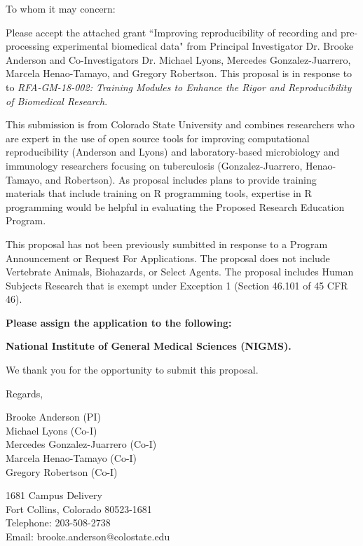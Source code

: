 \documentclass[pdftex,english,11pt,parskip=half]{scrartcl}
\begin{document}
\def\bf{\normalfont\bfseries}
\pagestyle{empty}

To whom it may concern:

\vspace{0.2in}

Please accept the attached grant ``Improving reproducibility of recording and pre-processing experimental biomedical data" from Principal Investigator Dr. Brooke Anderson and Co-Investigators Dr. Michael Lyons, Mercedes Gonzalez-Juarrero, Marcela Henao-Tamayo, and Gregory Robertson. This proposal is in response to to \textit{RFA-GM-18-002: Training Modules to Enhance the Rigor and Reproducibility of Biomedical Research}.

\vspace{0.1in}

This submission is from Colorado State University and combines researchers who are expert in the use of open source tools for improving computational reproducibility (Anderson and Lyons) and laboratory-based microbiology and immunology researchers focusing on tuberculosis (Gonzalez-Juarrero, Henao-Tamayo, and Robertson). As proposal includes plans to provide training materials that include training on R programming tools, expertise in R programming would be helpful in evaluating the Proposed Research Education Program.

\vspace{0.1in}

This proposal has not been previously sumbitted in response to a Program Announcement or Request For Applications. The proposal does not include Vertebrate Animals, Biohazards, or Select Agents. The proposal includes Human Subjects Research that is exempt under Exception 1 (Section 46.101 of 45 CFR 46).

\vspace{0.1in}

\noindent \textbf{Please assign the application to the following:}
\begin{description}
 \item \textbf{National Institute of General Medical Sciences (NIGMS).} 
 \end{description}

\vspace{0.1in}

We thank you for the opportunity to submit this proposal. 

\vspace{0.2in}

Regards, 

Brooke Anderson (PI) \\
Michael Lyons (Co-I) \\
Mercedes Gonzalez-Juarrero (Co-I) \\
Marcela Henao-Tamayo (Co-I) \\
Gregory Robertson (Co-I)

1681 Campus Delivery \\
Fort Collins, Colorado 80523-1681 \\
Telephone: 203-508-2738 \\
Email: brooke.anderson@colostate.edu \\
\end{document}
